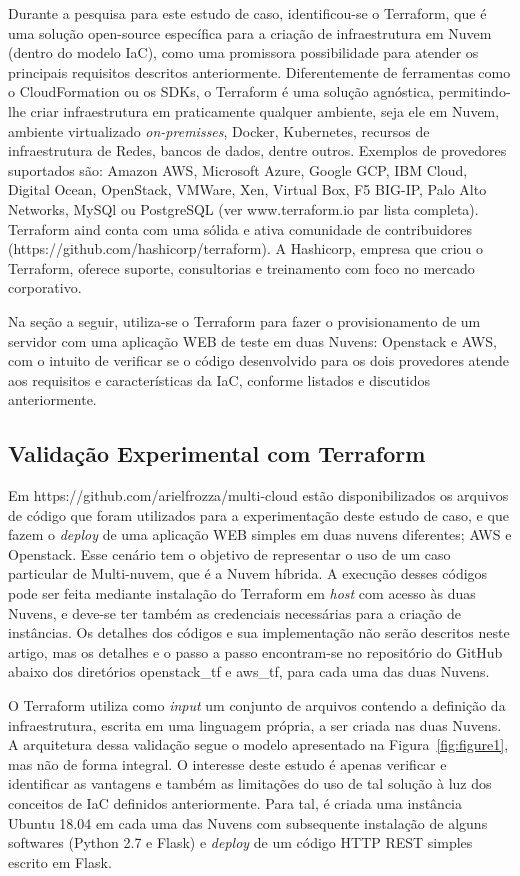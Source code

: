 \documentclass[12pt]{article}
\begin{document}
	Durante a pesquisa para este estudo de caso, identificou-se o Terraform, que é uma solução open-source específica para a criação de infraestrutura em Nuvem (dentro do modelo IaC), como uma promissora possibilidade para atender os principais requisitos descritos anteriormente. Diferentemente de ferramentas como o CloudFormation ou os SDKs, o Terraform é uma solução agnóstica, permitindo-lhe criar infraestrutura em praticamente qualquer ambiente, seja ele em Nuvem, ambiente virtualizado \textit{on-premisses}, Docker, Kubernetes, recursos de infraestrutura de Redes, bancos de dados, dentre outros. Exemplos de provedores suportados são: Amazon AWS, Microsoft Azure, Google GCP, IBM Cloud, Digital Ocean, OpenStack, VMWare, Xen, Virtual Box, F5 BIG-IP, Palo Alto Networks, MySQl ou PostgreSQL (ver www.terraform.io par lista completa). Terraform aind conta com uma sólida e ativa comunidade de contribuidores (https://github.com/hashicorp/terraform). A Hashicorp, empresa que criou o Terraform, oferece suporte, consultorias e treinamento com foco no mercado corporativo.
	
	Na seção a seguir, utiliza-se o Terraform para fazer o provisionamento de um servidor com uma aplicação WEB de teste em duas Nuvens: Openstack e AWS, com o intuito de verificar se o código desenvolvido para os dois provedores atende aos requisitos e características da IaC, conforme listados e discutidos anteriormente.  
	
	\subsection{Validação Experimental com Terraform}
		
	Em https://github.com/arielfrozza/multi-cloud estão disponibilizados os arquivos de código que foram utilizados para a experimentação deste estudo de caso, e que fazem o \textit{deploy} de uma aplicação WEB simples em duas nuvens diferentes; AWS e Openstack. Esse cenário tem o objetivo de representar o uso de um caso particular de Multi-nuvem, que é a Nuvem híbrida. A execução desses códigos pode ser feita mediante instalação do Terraform em \textit{host} com acesso às duas Nuvens, e deve-se ter também as credenciais necessárias para a criação de instâncias. Os detalhes dos códigos e sua implementação não serão descritos neste artigo, mas os detalhes e o passo a passo encontram-se no repositório do GitHub abaixo dos diretórios openstack\_tf e aws\_tf, para cada uma das duas Nuvens.
	
	O Terraform utiliza como \textit{input} um conjunto de arquivos contendo a definição da infraestrutura, escrita em uma linguagem própria, a ser criada nas duas Nuvens. A arquitetura dessa validação segue o modelo apresentado na Figura~\ref{fig:figure1}, mas não de forma integral. O interesse deste estudo é apenas verificar e identificar as vantagens e também as limitações do uso de tal solução à luz dos conceitos de IaC definidos anteriormente. Para tal, é criada uma instância Ubuntu 18.04 em cada uma das Nuvens com subsequente instalação de alguns softwares (Python 2.7 e Flask) e \textit{deploy} de um código HTTP REST simples escrito em Flask.
	
\end{document}
